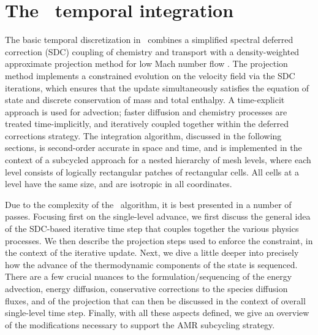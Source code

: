 \section{The \pelelm\ temporal integration}
The basic temporal discretization in \pelelm\ combines a simplified spectral deferred correction (SDC) coupling of chemistry and transport \cite{LMC_SDC} with a density-weighted approximate projection method for low Mach number flow \cite{DayBell:2000}.  The projection method implements a constrained evolution on the velocity field via the SDC iterations, which ensures that the update simultaneously satisfies the  equation of state and discrete conservation of mass and total enthalpy.
A time-explicit approach is used for advection; faster diffusion and chemistry processes are treated time-implicitly, and iteratively coupled together within the deferred corrections strategy. The integration algorithm, discussed in the following sections, is second-order accurate in space and time, and is implemented in the context of a subcycled approach for a nested hierarchy of mesh levels, where each level consists of logically rectangular patches of rectangular cells.  All cells at a level have the same size, and are isotropic in all coordinates.

Due to the complexity of the \pelelm\ algorithm, it is best presented in a number of passes.  Focusing first on the single-level advance, we first discuss the general idea of the SDC-based iterative time step that couples together the various physics processes.  We then describe the projection steps used to enforce the constraint, in the context of the iterative update.  Next, we dive a little deeper into precisely how the advance of the thermodynamic components of the state is sequenced.  There are a few crucial nuances to the formulation/sequencing of the energy advection, energy diffusion, conservative corrections to the species diffusion fluxes, and of the projection that can then be discussed in the context of overall single-level time step.  Finally, with all these aspects defined, we give an overview of the modifications necessary to support the AMR subcycling strategy.

